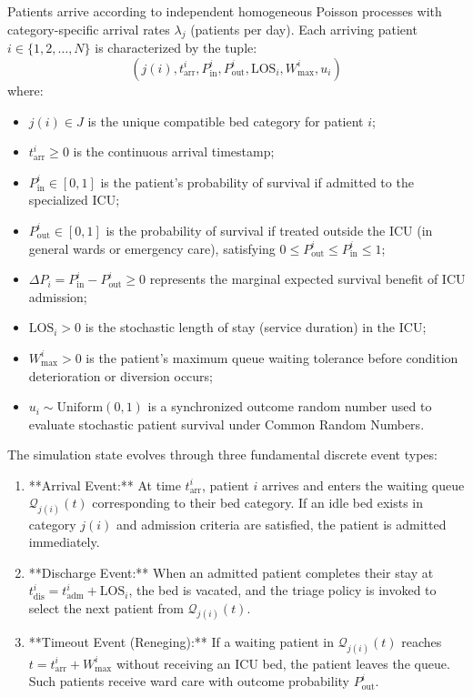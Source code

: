 \documentclass{ro}
\begin{document}
Patients arrive according to independent homogeneous Poisson processes with category-specific arrival rates $\lambda_j$ (patients per day). Each arriving patient $i \in \{1, 2, \dots, N\}$ is characterized by the tuple:
\begin{equation}
    (j(i), t_{\text{arr}}^i, P_{\text{in}}^i, P_{\text{out}}^i, \text{LOS}_i, W_{\max}^i, u_i)
\end{equation}
where:
\begin{itemize}
    \item $j(i) \in J$ is the unique compatible bed category for patient $i$;
    \item $t_{\text{arr}}^i \ge 0$ is the continuous arrival timestamp;
    \item $P_{\text{in}}^i \in [0, 1]$ is the patient's probability of survival if admitted to the specialized ICU;
    \item $P_{\text{out}}^i \in [0, 1]$ is the probability of survival if treated outside the ICU (in general wards or emergency care), satisfying $0 \le P_{\text{out}}^i \le P_{\text{in}}^i \le 1$;
    \item $\Delta P_i = P_{\text{in}}^i - P_{\text{out}}^i \ge 0$ represents the marginal expected survival benefit of ICU admission;
    \item $\text{LOS}_i > 0$ is the stochastic length of stay (service duration) in the ICU;
    \item $W_{\max}^i > 0$ is the patient's maximum queue waiting tolerance before condition deterioration or diversion occurs;
    \item $u_i \sim \text{Uniform}(0, 1)$ is a synchronized outcome random number used to evaluate stochastic patient survival under Common Random Numbers.
\end{itemize}

The simulation state evolves through three fundamental discrete event types:
\begin{enumerate}
    \item **Arrival Event:** At time $t_{\text{arr}}^i$, patient $i$ arrives and enters the waiting queue $\mathcal{Q}_{j(i)}(t)$ corresponding to their bed category. If an idle bed exists in category $j(i)$ and admission criteria are satisfied, the patient is admitted immediately.
    \item **Discharge Event:** When an admitted patient completes their stay at $t_{\text{dis}}^i = t_{\text{adm}}^i + \text{LOS}_i$, the bed is vacated, and the triage policy is invoked to select the next patient from $\mathcal{Q}_{j(i)}(t)$.
    \item **Timeout Event (Reneging):** If a waiting patient in $\mathcal{Q}_{j(i)}(t)$ reaches $t = t_{\text{arr}}^i + W_{\max}^i$ without receiving an ICU bed, the patient leaves the queue. Such patients receive ward care with outcome probability $P_{\text{out}}^i$.
\end{enumerate}
\end{document}
